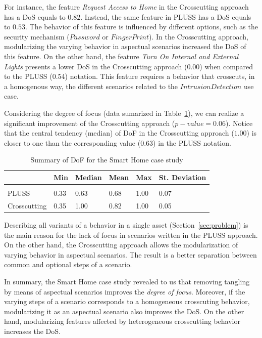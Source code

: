 \documentclass{acm_proc_article-sp}
\begin{document}
For instance, the feature \emph{Request Access to Home} in the Crosscutting
approach has a DoS equals to $0.82$. Instead, the same feature in PLUSS has a
DoS equals to $0.53$. The behavior of this feature is influenced by different
options, such as the security mechanism ($Password$ or $Finger Print$).
In the Crosscutting approach, modularizing the varying behavior in 
aspectual scenarios increased the DoS of this feature. 
On the other hand, the feature \emph{Turn On Internal and External Lights}
presents a lower DoS in the Crosscutting approach (0.00) when compared to the
PLUSS (0.54) notation. This feature requires a behavior that crosscuts, in a
homogenous way, the different scenarios related to the $Intrusion Detection$ use
case. 

Considering the degree of focus (data sumarized in Table~\ref{tab:sh-dof}), we
can realize a significant improvement of the Crosscutting approach
($p-value=0.06$). Notice that the central tendency (median) of DoF in the
Crosscutting approach ($1.00$) is closer to one than the corresponding value
($0.63$) in the PLUSS notation.
  
\begin{table}[htb] \centering
\caption{Summary of DoF for the Smart Home case study}
\label{tab:sh-dof}
\begin{small}
\begin{tabular}{llllll} \hline
					& Min 	& Median 	& Mean 	& Max 	& St. Deviation \\ \hline \\
	PLUSS			& 0.33  & 0.63   	& 0.68  & 1.00 	& 0.07 			\\
	Crosscutting	& 0.35  & 1.00   	& 0.82 	& 1.00 	& 0.05			\\ \hline	
\end{tabular}
\end{small}
\end{table}

Describing all variants of a behavior in a single asset
(Section~\ref{sec:problem}) is the main reason for the lack of focus in scenarios
written in the PLUSS approach. On the other hand, the Crosscutting approach
allows the modularization of varying behavior in aspectual scenarios. The result
is a better separation between common and optional steps of a scenario. 

In summary, the Smart Home case study revealed to us that removing tangling by
means of aspectual scenarios improves the \emph{degree of focus}. Moreover, if
the varying steps of a scenario corresponds to a homogeneous crosscuting
behavior, modularizing it as an aspectual scenario also improves the DoS. On the
other hand, modularizing features affected by heterogeneous crosscutting
behavior increases the DoS.
\end{document}
